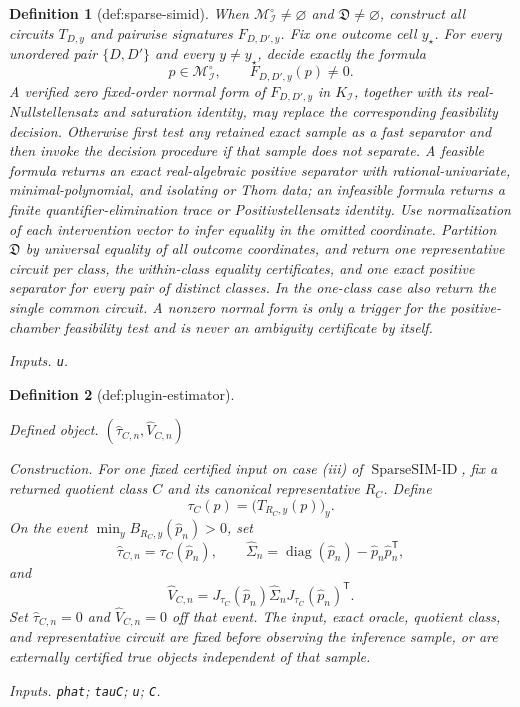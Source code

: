 \documentclass{article}
\newtheorem{definition}{Definition}
\begin{document}
\begin{definition}[def:sparse-simid]
When \(\mathcal M_{\mathcal I}^{\circ}\neq\varnothing\) and \(\mathfrak D\neq\varnothing\), construct all circuits \(T_{D,y}\) and pairwise signatures \(F_{D,D',y}\).  Fix one outcome cell \(y_\star\).  For every unordered pair \(\{D,D'\}\) and every \(y\neq y_\star\), decide exactly the formula
\[
 p\in\mathcal M_{\mathcal I}^{\circ},\qquad F_{D,D',y}(p)\neq0.
\]
A verified zero fixed-order normal form of \(F_{D,D',y}\) in \(K_{\mathcal I}\), together with its real-Nullstellensatz and saturation identity, may replace the corresponding feasibility decision.  Otherwise first test any retained exact sample as a fast separator and then invoke the decision procedure if that sample does not separate.  A feasible formula returns an exact real-algebraic positive separator with rational-univariate, minimal-polynomial, and isolating or Thom data; an infeasible formula returns a finite quantifier-elimination trace or Positivstellensatz identity.  Use normalization of each intervention vector to infer equality in the omitted coordinate.  Partition \(\mathfrak D\) by universal equality of all outcome coordinates, and return one representative circuit per class, the within-class equality certificates, and one exact positive separator for every pair of distinct classes.  In the one-class case also return the single common circuit.  A nonzero normal form is only a trigger for the positive-chamber feasibility test and is never an ambiguity certificate by itself.
\par\smallskip\noindent\emph{Inputs.} \texttt{u}.
\end{definition}

\begin{definition}[def:plugin-estimator]\label{def:plugin-estimator}
\par\smallskip\noindent\emph{Defined object.} \((\widehat\tau_{C,n},\widehat V_{C,n})\)
\par\smallskip\noindent\emph{Construction.} For one fixed certified input on case (iii) of \(\operatorname{SparseSIM\text{-}ID}\), fix a returned quotient class \(C\) and its canonical representative \(R_C\).  Define
\[
 \tau_C(p)=\bigl(T_{R_C,y}(p)\bigr)_y.
\]
On the event \(\min_yB_{R_C,y}(\widehat p_n)>0\), set
\[
 \widehat\tau_{C,n}=\tau_C(\widehat p_n),
 \qquad
 \widehat\Sigma_n=\operatorname{diag}(\widehat p_n)-\widehat p_n\widehat p_n^{\mathsf T},
\]
and
\[
 \widehat V_{C,n}
 =J_{\tau_C}(\widehat p_n)\widehat\Sigma_n
 J_{\tau_C}(\widehat p_n)^{\mathsf T}.
\]
Set \(\widehat\tau_{C,n}=0\) and \(\widehat V_{C,n}=0\) off that event.  The input, exact oracle, quotient class, and representative circuit are fixed before observing the inference sample, or are externally certified true objects independent of that sample.
\par\smallskip\noindent\emph{Inputs.} \texttt{phat}; \texttt{tauC}; \texttt{u}; \texttt{C}.
\end{definition}
\end{document}
